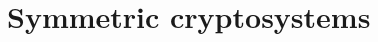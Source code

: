 \documentclass[a4paper,10pt]{article}
\begin{document}
\section*{Symmetric cryptosystems}
\end{document}
